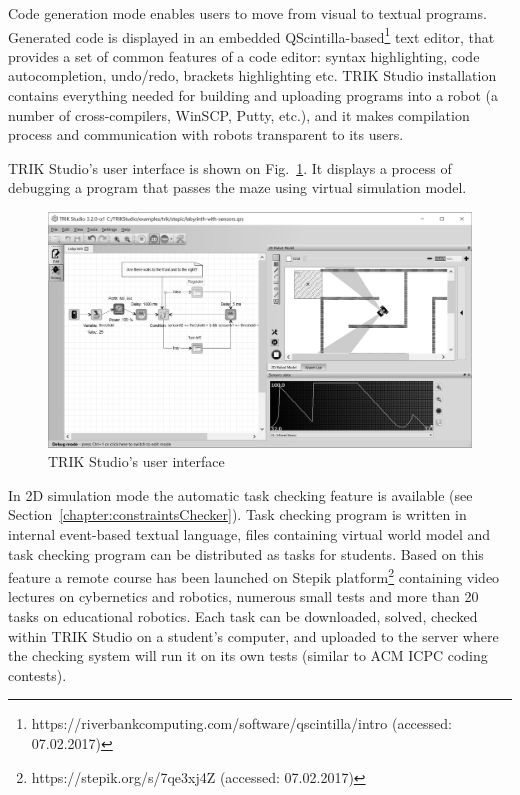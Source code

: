 \documentclass[conference]{IEEEtran}
\begin{document}
Code generation mode enables users to move from visual to textual programs. Generated code is displayed in an embedded QScintilla-based\footnote{https://riverbankcomputing.com/software/qscintilla/intro (accessed: 07.02.2017)} text editor, that provides a set of common features of a code editor: syntax highlighting, code autocompletion, undo/redo, brackets highlighting etc. TRIK Studio installation contains everything needed for building and uploading programs into a robot (a number of cross-compilers, WinSCP, Putty, etc.), and it makes compilation process and communication with robots transparent to its users.

TRIK Studio's user interface is shown on Fig.~\ref{image:TS_interface}. It displays a process of debugging a program that passes the maze using virtual simulation model.

\begin{figure}[ht]
    \includegraphics[width=\textwidth]{TS_CF_Labyrinth.png}
    \caption{TRIK Studio's user interface}
    \label{image:TS_interface}
\end{figure}

In 2D simulation mode the automatic task checking feature is available (see Section~\ref{chapter:constraintsChecker}). Task checking program is written in internal event-based textual language, files containing virtual world model and task checking program can be distributed as tasks for students. Based on this feature a remote course has been launched on Stepik platform\footnote{https://stepik.org/s/7qe3xj4Z (accessed: 07.02.2017)} containing video lectures on cybernetics and robotics, numerous small tests and more than 20 tasks on educational robotics. Each task can be downloaded, solved, checked within TRIK Studio on a student's computer, and uploaded to the server where the checking system will run it on its own tests (similar to ACM ICPC coding contests).
\end{document}
